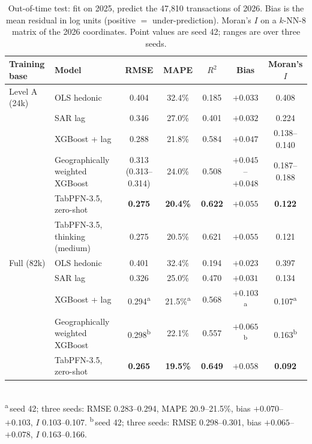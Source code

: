 \documentclass[11pt,a4paper]{article}
\begin{document}
\begin{table}[h]
\centering\small
\caption{Out-of-time test: fit on 2025, predict the 47{,}810 transactions of 2026. Bias is the
mean residual in log units (positive $=$ under-prediction). Moran's $I$ on a $k$-NN-8 matrix of
the 2026 coordinates. Point values are seed 42; ranges are over three seeds.}
\label{tab:oot}
\scriptsize\setlength{\tabcolsep}{2.6pt}
\begin{tabular}{llccccc}
\toprule
Training base & Model & RMSE & MAPE & $R^2$ & Bias & Moran's $I$ \\
\midrule
Level A (24k) & OLS hedonic & 0.404 & 32.4\% & 0.185 & $+0.033$ & 0.408 \\
 & SAR lag & 0.346 & 27.0\% & 0.401 & $+0.032$ & 0.224 \\
 & XGBoost + lag & 0.288 & 21.8\% & 0.584 & $+0.047$ & 0.138--0.140 \\
 & Geographically weighted XGBoost & 0.313 (0.313--0.314) & 24.0\% & 0.508 & $+0.045$--$+0.048$ & 0.187--0.188 \\
 & TabPFN-3.5, zero-shot & \textbf{0.275} & \textbf{20.4\%} & \textbf{0.622} & $+0.055$ & \textbf{0.122} \\
 & TabPFN-3.5, thinking (medium) & 0.275 & 20.5\% & 0.621 & $+0.055$ & 0.121 \\
\midrule
Full (82k) & OLS hedonic & 0.401 & 32.4\% & 0.194 & $+0.023$ & 0.397 \\
 & SAR lag & 0.326 & 25.0\% & 0.470 & $+0.031$ & 0.134 \\
 & XGBoost + lag & 0.294\textsuperscript{a} & 21.5\%\textsuperscript{a} & 0.568 & $+0.103$\textsuperscript{a} & 0.107\textsuperscript{a} \\
 & Geographically weighted XGBoost & 0.298\textsuperscript{b} & 22.1\% & 0.557 & $+0.065$\textsuperscript{b} & 0.163\textsuperscript{b} \\
 & TabPFN-3.5, zero-shot & \textbf{0.265} & \textbf{19.5\%} & \textbf{0.649} & $+0.058$ & \textbf{0.092} \\
\bottomrule
\end{tabular}\\[2pt]
{\scriptsize \textsuperscript{a}\,seed 42; three seeds: RMSE 0.283--0.294, MAPE 20.9--21.5\%, bias $+0.070$--$+0.103$, $I$ 0.103--0.107.\quad
\textsuperscript{b}\,seed 42; three seeds: RMSE 0.298--0.301, bias $+0.065$--$+0.078$, $I$ 0.163--0.166.}
\end{table}
\end{document}
